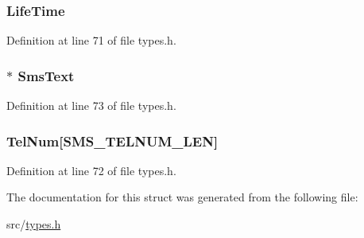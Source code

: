\subsubsection[{Life\+Time}]{ Life\+Time}\label{struct_s_m_s___queque___type_def_1_1_s_m_s___type_def_a455e8cf5aa85d24b7016183cfbaf4160}


Definition at line 71 of file types.\+h.

\hypertarget{struct_s_m_s___queque___type_def_1_1_s_m_s___type_def_aaa5626d5395532caeb6f03a42afc0b7c}{}
\subsubsection[{Sms\+Text}]{$\ast$ Sms\+Text}\label{struct_s_m_s___queque___type_def_1_1_s_m_s___type_def_aaa5626d5395532caeb6f03a42afc0b7c}


Definition at line 73 of file types.\+h.

\hypertarget{struct_s_m_s___queque___type_def_1_1_s_m_s___type_def_a0a579b08ecf1475050993cc022879540}{}
\subsubsection[{Tel\+Num}]{ Tel\+Num\mbox{[}{\bf S\+M\+S\+\_\+\+T\+E\+L\+N\+U\+M\+\_\+\+L\+E\+N}\mbox{]}}\label{struct_s_m_s___queque___type_def_1_1_s_m_s___type_def_a0a579b08ecf1475050993cc022879540}


Definition at line 72 of file types.\+h.



The documentation for this struct was generated from the following file\+:\begin{DoxyCompactItemize}
\item 
src/\hyperlink{types_8h}{types.\+h}\end{DoxyCompactItemize}
